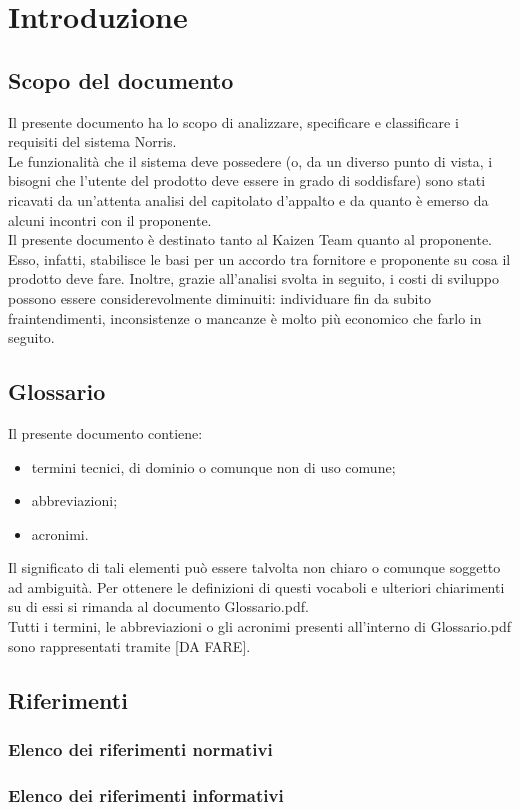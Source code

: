 \section{Introduzione}
	\subsection{Scopo del documento}
		Il presente documento ha lo scopo di analizzare, specificare e classificare i requisiti del sistema Norris.\\
		Le funzionalità che il sistema deve possedere (o, da un diverso punto di vista, i bisogni che l'utente del prodotto deve essere in grado di soddisfare) sono stati ricavati da un'attenta analisi del capitolato d'appalto e da quanto è emerso da alcuni incontri con il proponente.\\
		Il presente documento è destinato tanto al Kaizen Team quanto al proponente. Esso, infatti, stabilisce le basi per un accordo tra fornitore e proponente su cosa il prodotto deve fare. Inoltre, grazie all'analisi svolta in seguito, i costi di sviluppo possono essere considerevolmente diminuiti: individuare fin da subito fraintendimenti, inconsistenze o mancanze è molto più economico che farlo in seguito.
	\subsection{Glossario}
		Il presente documento contiene:
		\begin{itemize}
			\item termini tecnici, di dominio o comunque non di uso comune;
			\item abbreviazioni; 
			\item acronimi.
		\end{itemize}
		Il significato di tali elementi può essere talvolta non chiaro o comunque soggetto ad ambiguità. Per ottenere le definizioni di questi vocaboli e ulteriori chiarimenti su di essi si rimanda al documento Glossario.pdf.\\
		Tutti i termini, le abbreviazioni o gli acronimi presenti all'interno di Glossario.pdf sono rappresentati tramite [DA FARE].
	\subsection{Riferimenti}
		\subsubsection{Elenco dei riferimenti normativi}
		\subsubsection{Elenco dei riferimenti informativi}
